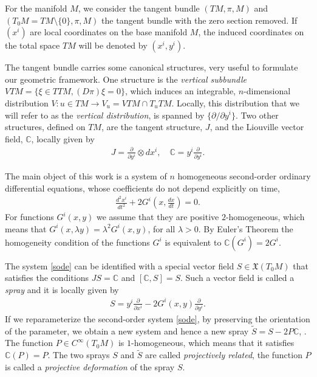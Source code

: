 \documentclass[oneside,english]{amsart}
\numberwithin{equation}{section}
\numberwithin{figure}{section}
\theoremstyle{plain}
\theoremstyle{plain}
\theoremstyle{definition}
\theoremstyle{plain}
\theoremstyle{plain}
\theoremstyle{plain}
\theoremstyle{remark}
\theoremstyle{remark}
\begin{document}
For the manifold $M$, we consider the tangent bundle $(TM, \pi, M)$ and
$(T_0M=TM\setminus\{0\}, \pi, M)$ the tangent bundle with the zero
section removed. If $(x^i)$ are local coordinates on the base manifold
$M$, the induced coordinates on the total space $TM$ will be denoted
by $(x^i, y^i)$. 

The tangent bundle carries some canonical structures, very useful to
formulate our geometric framework. One structure is the \emph{vertical
  subbundle} $VTM=\{\xi \in TTM, (D\pi)\xi=0\}$, which induces an
integrable, $n$-dimensional distribution $V: u\in TM \to V_u=VTM\cap
T_uTM$. Locally, this distribution that we will refer to as the
\emph{vertical distribution}, is spanned by $\{\partial /\partial
y^i\}$. Two other structures, defined on $TM$, are the tangent
structure, $J$, and the Liouville vector field, $\mathbb{C}$, locally
given by 
\begin{eqnarray*}
  J=\frac{\partial}{\partial y^i}\otimes dx^i, \quad
  \mathbb{C}=y^i\frac{\partial}{\partial y^i}. \end{eqnarray*}

The main object of this work is a system of $n$ homogeneous second-order
ordinary differential equations, whose coefficients do not depend
explicitly on time, 
\begin{eqnarray}
  \frac{d^2x^i}{dt^2} + 2G^i\left(x,
    \frac{dx}{dt}\right)=0. \label{sode} \end{eqnarray}
For functions $G^i(x,y)$ we assume that they are positive
$2$-homogeneous, which means that 
$G^i(x,\lambda y)=\lambda^2 G^i(x,y)$, for all $\lambda>0$.  By
Euler's Theorem the homogeneity condition of the functions $G^i$ is
equivalent to $\mathbb{C}(G^i)=2G^i$.       

The system \eqref{sode} can be identified with a special vector field
$S\in \mathfrak{X}(T_0M)$ that satisfies the conditions
$JS=\mathbb{C}$ and $[\mathbb{C}, S]=S$. Such a vector field is called
a \emph{spray} and it is locally given by 
\begin{eqnarray}
  S=y^i\frac{\partial}{\partial x^i} - 2G^i(x,y)\frac{\partial}{\partial
    y^i}. \label{slocal} \end{eqnarray}
If we reparameterize the second-order system \eqref{sode}, by preserving the
orientation of the parameter, we obtain a new system and hence a new
spray $\tilde{S}=S-2P\mathbb{C}$, \cite{AIM93, Shen01}. The function $P\in
C^{\infty}(T_0M)$ is $1$-homogeneous, which means that it satisfies
$\mathbb{C}(P)=P$. The two sprays $S$ and $\tilde{S}$ are called
\emph{projectively related}, the function $P$ is called a
\emph{projective deformation} of the spray $S$. 
\end{document}
